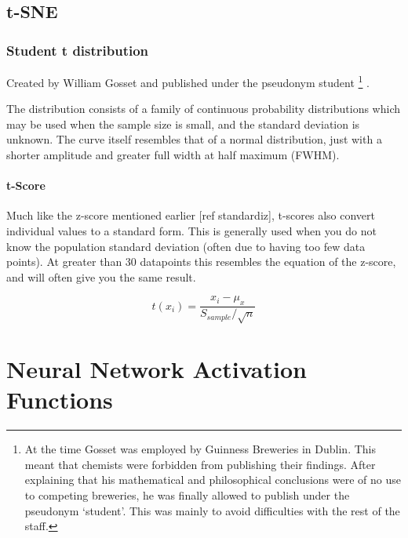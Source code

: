 \section {t-SNE} \label{appendix:tsne}

\subsection{Student t distribution}

Created by William Gosset and published under the pseudonym student \footnote{ At the time Gosset was employed by Guinness Breweries in Dublin. This meant that chemists were forbidden from publishing their findings. After explaining that his mathematical and philosophical conclusions were of no use to competing breweries, he was finally allowed to publish under the pseudonym `student'. This was mainly to avoid difficulties with the rest of the staff.} \cite{student}.

The distribution consists of a family of continuous probability distributions which may be used when the sample size is small, and the standard deviation is unknown. The curve itself resembles that of a normal distribution, just with a shorter amplitude and greater full width at half maximum (FWHM).


\subsubsection{t-Score}
Much like the z-score mentioned earlier [ref standardiz], t-scores also convert individual values to a standard form. This is generally used when you do not know the population standard deviation (often due to having too few data points). At greater than 30 datapoints this resembles the equation of the z-score, and will often give you the same result.


\begin{equation}
    t(x_i) = \frac{x_i - \mu_x}{S_{sample}/\sqrt{n} }
    \label{eqn:t}
\end{equation}
%
%


\chapter{Neural Network Activation Functions}\label{appendix:activation}


